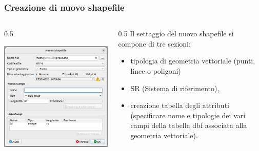 \documentclass{beamer}
\begin{document}
{ \begin{frame}
   \frametitle{Creazione di nuovo shapefile}
 	\begin{columns}
		\begin{column} {0.5\textwidth}	
			 \begin{center}
			\includegraphics[width=1\textwidth] {digitizing_pics/Nuovo Layer Vettoriale 2022-10-11 09-59-20.png}
		    \end{center}
		\end{column}
 
		\begin{column} {0.5\textwidth}	
			Il settaggio del nuovo shapefile si compone di tre sezioni:  
    	 \begin{itemize}
    		\item tipologia di geometria vettoriale (punti, linee o poligoni)
    		\item SR (Sistema di riferimento),
    		\item creazione tabella degli attributi (specificare nome e tipologie dei vari campi della tabella dbf associata alla geometria vettoriale).
    	\end{itemize}				
		\end{column}
		
	\end{columns}	
	   
\end{frame} 


}
\end{document}
